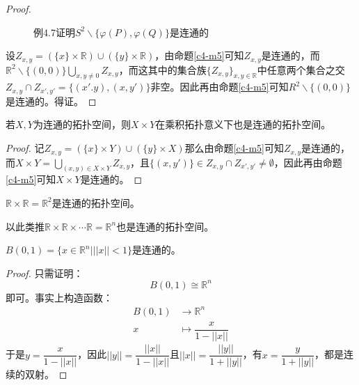 \documentclass[lang=cn,10pt,device=pad]{elegantbook}
\newcommand{\dabing}{\displaystyle\bigcup}
\newcommand{\dkh}[1]{\{#1\}}
\newcommand{\chadiao}{\backslash}
\newcommand{\R}{\mathbb{R}}
\begin{document}
\begin{proof}
\begin{figure}[h]
\begin{tikzpicture}[x=0.75pt,y=0.75pt,yscale=-1,xscale=1]
\end{tikzpicture}
\caption{例4.7证明$S^{2}\chadiao\dkh{\varphi(P),\varphi(Q)}$是连通的}
	\end{figure}
	
	
	
	
	设$Z_{x,y} = (\dkh{x}\times \mathbb{R})\cup(\dkh{y}\times \mathbb{R})$，由命题\ref{c4-m5}可知$Z_{x,y}$是连通的，而$\R^{2}\chadiao\dkh{(0,0)}\dabing_{x,y\neq 0}Z_{x,y}$，而这其中的集合族$\dkh{Z_{x,y}}_{x,y\in\R }$中任意两个集合之交$Z_{x,y}\cap Z_{x',y'} = \dkh{(x'.y),(x,y')}$非空。因此再由命题\ref{c4-m5}可知$R^{2}\chadiao\dkh{(0,0)}$是连通的。得证。
\end{proof}


\begin{proposition}[连通拓扑空间的乘积拓扑空间也是连通的]
	若$X,Y$为连通的拓扑空间，则$X\times Y$在乘积拓扑意义下也是连通的拓扑空间。
\end{proposition}
\begin{proof}
	记$Z_{x,y} =(\dkh{x}\times Y)\cup(\dkh{y}\times X)$那么由命题\ref{c4-m5}可知$Z_{x,y}$是连通的，而$X\times Y = \dabing_{(x,y)\in X\times Y}Z_{x,y}$，且$\dkh{(x,y')}\in Z_{x,y}\cap Z_{x',y'}\neq \emptyset$，因此再由命题\ref{c4-m5}可知$X\times Y$是连通的。
\end{proof}
\begin{example}[欧氏空间是连通的]
	$\R \times \R = \R^{2}$是连通的拓扑空间。
	\begin{note}
	以此类推$\R \times \R \times \cdots \R  = \R^{n}$也是连通的拓扑空间。	
	\end{note}
\end{example}
\begin{example}[欧氏空间中的单位球面是连通的]
	$B(0,1) = \dkh{x\in \mathbb{R}^{n}|||x||<1}$是连通的。
\end{example}
\begin{proof}
	只需证明：
	\begin{equation*}
		B(0,1)\cong \mathbb{R}^{n}
	\end{equation*}即可。事实上构造函数：
	\begin{equation*}
		\begin{aligned}
			B(0,1)&\longrightarrow \mathbb{R}^{n}\\
			x&\longmapsto \dfrac{x}{1-||x||}
		\end{aligned}
	\end{equation*}
	于是$y = \dfrac{x}{1-||x||}$，因此$||y|| = \dfrac{||x||}{1-||x||}$且$||x|| = \dfrac{||y||}{1+||y||}$，有$x = \dfrac{y}{1+||y||}$，都是连续的双射。
\end{proof}
\end{document}
